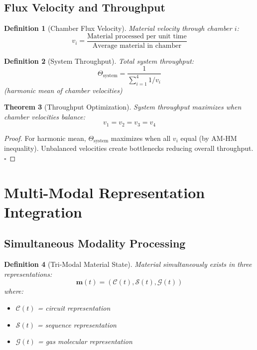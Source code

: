 \documentclass[12pt]{article}
\newtheorem{theorem}{Theorem}
\newtheorem{definition}[theorem]{Definition}
\begin{document}
\subsection{Flux Velocity and Throughput}

\begin{definition}[Chamber Flux Velocity]
Material velocity through chamber $i$:
$$
v_i = \frac{\text{Material processed per unit time}}{\text{Average material in chamber}}
$$
\end{definition}

\begin{definition}[System Throughput]
Total system throughput:
$$
\Theta_{\text{system}} = \frac{1}{\sum_{i=1}^{4} 1/v_i}
$$
(harmonic mean of chamber velocities)
\end{definition}

\begin{theorem}[Throughput Optimization]
System throughput maximizes when chamber velocities balance:
$$
v_1 = v_2 = v_3 = v_4
$$
\end{theorem}

\begin{proof}
For harmonic mean, $\Theta_{\text{system}}$ maximizes when all $v_i$ equal (by AM-HM inequality). Unbalanced velocities create bottlenecks reducing overall throughput.
$\square$
\end{proof}

\section{Multi-Modal Representation Integration}

\subsection{Simultaneous Modality Processing}

\begin{definition}[Tri-Modal Material State]
Material simultaneously exists in three representations:
$$
\mathbf{m}(t) = (\mathcal{C}(t), \mathcal{S}(t), \mathcal{G}(t))
$$
where:
\begin{itemize}
    \item $\mathcal{C}(t)$ = circuit representation
    \item $\mathcal{S}(t)$ = sequence representation
    \item $\mathcal{G}(t)$ = gas molecular representation
\end{itemize}
\end{definition}
\end{document}
